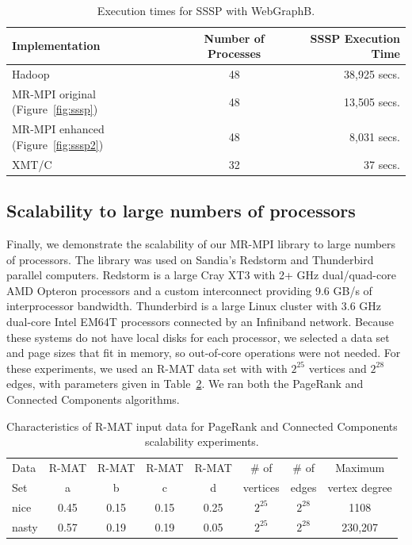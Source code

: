 \begin{table}
\begin{center}
\begin{tabular}{|l|c|r|}
\hline
Implementation & Number of Processes & SSSP Execution Time \\
\hline
Hadoop & 48  & 38,925 secs.\\
MR-MPI original (Figure~\ref{fig:sssp}) & 48 &  13,505 secs.\\
MR-MPI enhanced (Figure~\ref{fig:sssp2}) & 48 &  8,031 secs.\\
XMT/C  & 32 &  37 secs.\\
\hline
\end{tabular}
\caption{Execution times for SSSP with {WebGraphB}.}
\label{t:ssspB}
\end{center}
\end{table}

\subsection{Scalability to large numbers of processors}

Finally, we demonstrate the scalability of our MR-MPI library to large
numbers of processors.  The library was used on Sandia's Redstorm and
Thunderbird parallel computers.  Redstorm is a large Cray XT3 with 2+
{GHz} dual/quad-core AMD Opteron processors and a custom interconnect
providing 9.6 GB/s of interprocessor bandwidth.  Thunderbird is a
large Linux cluster with 3.6 {GHz} dual-core Intel EM64T processors
connected by an Infiniband network.  Because these systems do not have
local disks for each processor, we selected a data set and page sizes
that fit in memory, so out-of-core operations were not needed.  For
these experiments, we used an R-MAT data set with with $2^{25}$
vertices and $2^{28}$ edges, with parameters given in
Table~\ref{t:rmat}.  We ran both the PageRank and Connected Components
algorithms.

\begin{table}
\begin{center}
\begin{tabular}{|l|c|c|c|c|c|c|c|}
\hline
Data & R-MAT  & R-MAT  & R-MAT  & R-MAT  & \# of    & \# of & Maximum \\
Set  & a      & b      & c      & d      & vertices & edges & vertex degree\\
\hline
nice  & 0.45 & 0.15 & 0.15 & 0.25 & $2^{25}$ & $2^{28}$ & 1108 \\
nasty & 0.57 & 0.19 & 0.19 & 0.05 & $2^{25}$ & $2^{28}$ & 230,207\\
\hline
\end{tabular}
\caption{Characteristics of R-MAT input data for PageRank and Connected
Components scalability experiments.}
\label{t:rmat}
\end{center}
\end{table}

